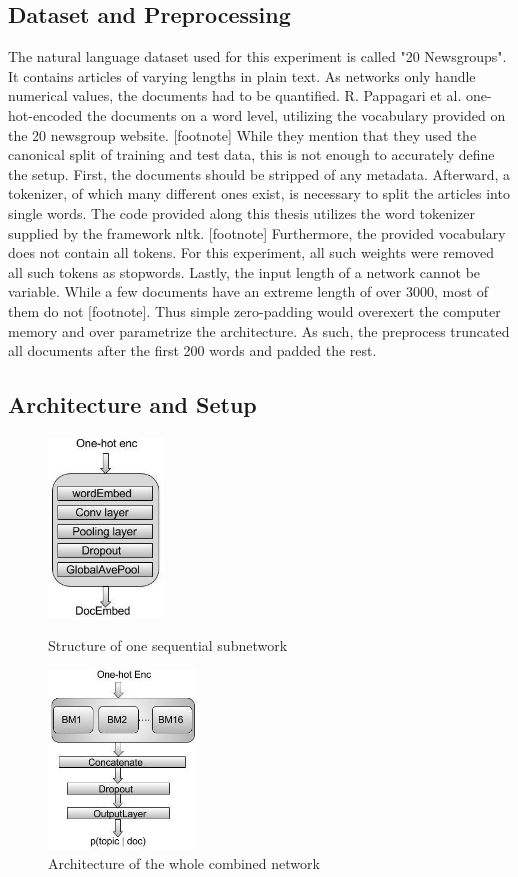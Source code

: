 \subsection*{Dataset and Preprocessing}
The natural language dataset used for this experiment is called "20 Newsgroups". It contains articles of varying lengths in plain text. As networks only handle numerical values, the documents had to be quantified. R. Pappagari et al. one-hot-encoded the documents on a word level, utilizing the vocabulary provided on the 20 newsgroup website. [footnote] 
While they mention that they used the canonical split of training and test data, this is not enough to accurately define the setup. First, the documents should be stripped of any metadata. Afterward, a tokenizer, of which many different ones exist, is necessary to split the articles into single words. The code provided along this thesis utilizes the word tokenizer supplied by the framework nltk. [footnote] Furthermore, the provided vocabulary does not contain all tokens. For this experiment, all such weights were removed all such tokens as stopwords. 
Lastly, the input length of a network cannot be variable. While a few documents have an extreme length of over 3000, most of them do not [footnote]. Thus simple zero-padding would overexert the computer memory and over parametrize the architecture. As such, the preprocess truncated all documents after the first 200 words and padded the rest.


\subsection*{Architecture and Setup}
\begin{figure}
	\begin{minipage}{0.5\textwidth}
		\centering
		\includegraphics[height=180px]{gfx/4-Design/base_module.png}
		\caption*{Structure of one sequential subnetwork}
		\label{?}
	\end{minipage}\hfill
	\begin{minipage}{0.5\textwidth}
		\centering
		\includegraphics[height=180px]{gfx/4-Design/combined_model.png}
		\caption*{Architecture of the whole combined network}
		\label{?}
	\end{minipage}
\end{figure}

